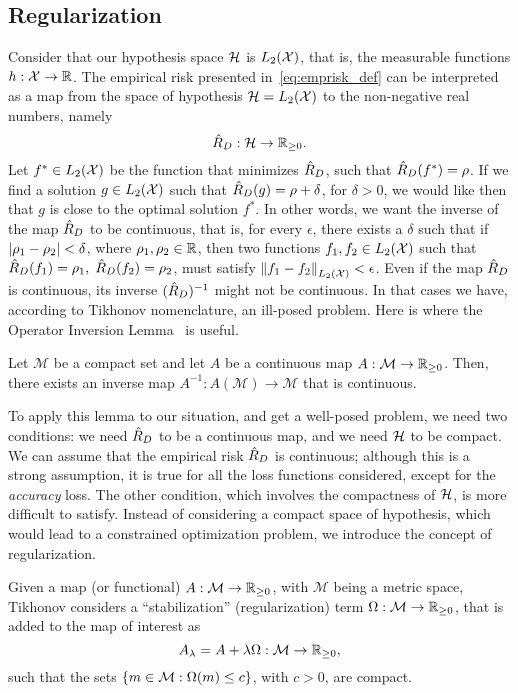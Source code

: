 \subsection{Regularization}
Consider that our hypothesis space $\mathcal{H}$ is $L_2(\mathcal{X})$, that is, the measurable functions $h: \mathcal{X} \to \mathbb{R}$.
The empirical risk presented in~\eqref{eq:emprisk_def} can be interpreted as a map from the space of hypothesis $\mathcal{H} = L_2(\mathcal{X})$ to the non-negative real numbers, namely
$$ \hat{R}_{D}: \mathcal{H} \to \mathbb{R}_{\geq 0} .$$
%
Let $f^* \in L_2(\mathcal{X})$ be the function that minimizes $\hat{R}_{D}$, such that $\hat{R}_{D}(f^*) = \rho$. If we find a solution $g \in L_2(\mathcal{X})$ such that $\hat{R}_{D}(g) = \rho + \delta$, for $\delta > 0$, we would like then that $g$ is close to the optimal solution $f^*$.
%
In other words, we want the inverse of the map $\hat{R}_{D}$ to be continuous, that is, for every $\epsilon$, there exists a $\delta$ such that if $\left|\rho_1 - \rho_2\right| < \delta$, where $\rho_1, \rho_2 \in \mathbb{R}$, then two functions $f_1, f_2 \in L_2(\mathcal{X})$ such that $\hat{R}_{D}(f_1) = \rho_1, \; \hat{R}_{D}(f_2) = \rho_2$, must satisfy $\left\lVert f_1 - f_2\right\rVert_{L_2(\mathcal{X})} < \epsilon$.
%
Even if the map $\hat{R}_{D}$ is continuous, its inverse $(\hat{R}_{D})^{-1}$ might not be continuous. In that cases we have, according to Tikhonov nomenclature, an ill-posed problem.
%
Here is where the Operator Inversion Lemma~\citep{riesz2012functional} is useful.
\begin{lemma}
    Let $\mathcal{M}$ be a compact set and let $A$ be a continuous map $A: \mathcal{M} \to \mathbb{R}_{\geq 0}$. Then, there exists an inverse map $A^{-1}: A(\mathcal{M}) \to \mathcal{M}$ that is continuous.
\end{lemma}
%
To apply this lemma to our situation, and get a well-posed problem, we need two conditions: we need $\hat{R}_{D}$ to be a continuous map, and we need $\mathcal{H}$ to be compact.
%
We can assume that the empirical risk $\hat{R}_{D}$ is continuous; although this is a strong assumption, it is true for all the loss functions considered, except for the \emph{accuracy} loss.
%
The other condition, which involves the compactness of $\mathcal{H}$, is more difficult to satisfy. Instead of considering a compact space of hypothesis, which would lead to a constrained optimization problem, we introduce the concept of regularization.

%
Given a map (or functional) $A: \mathcal{M} \to \mathbb{R}_{\geq 0}$, with $\mathcal{M}$ being a metric space,
Tikhonov considers a ``stabilization'' (regularization) term $\Omega: \mathcal{M} \to \mathbb{R}_{\geq 0}$, that is added to the map of interest as 
\begin{equation}
    \nonumber
    A_\lambda = A + \lambda \Omega: \mathcal{M} \to \mathbb{R}_{\geq 0} ,
\end{equation}
such that the sets $\left\{m \in \mathcal{M}: \Omega(m) \leq c\right\}$, with $c > 0$, are compact.

